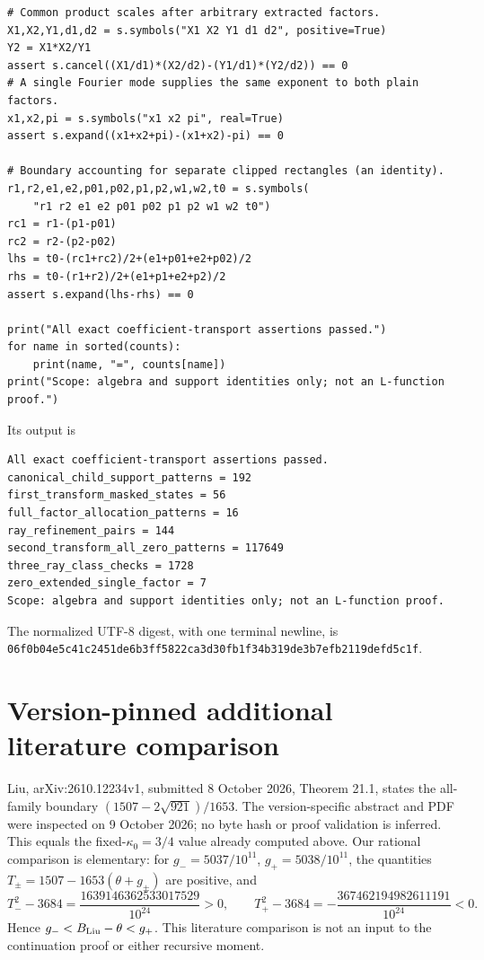 \documentclass[12pt]{article}
\begin{document}
\begin{verbatim}
# Common product scales after arbitrary extracted factors.
X1,X2,Y1,d1,d2 = s.symbols("X1 X2 Y1 d1 d2", positive=True)
Y2 = X1*X2/Y1
assert s.cancel((X1/d1)*(X2/d2)-(Y1/d1)*(Y2/d2)) == 0
# A single Fourier mode supplies the same exponent to both plain factors.
x1,x2,pi = s.symbols("x1 x2 pi", real=True)
assert s.expand((x1+x2+pi)-(x1+x2)-pi) == 0

# Boundary accounting for separate clipped rectangles (an identity).
r1,r2,e1,e2,p01,p02,p1,p2,w1,w2,t0 = s.symbols(
    "r1 r2 e1 e2 p01 p02 p1 p2 w1 w2 t0")
rc1 = r1-(p1-p01)
rc2 = r2-(p2-p02)
lhs = t0-(rc1+rc2)/2+(e1+p01+e2+p02)/2
rhs = t0-(r1+r2)/2+(e1+p1+e2+p2)/2
assert s.expand(lhs-rhs) == 0

print("All exact coefficient-transport assertions passed.")
for name in sorted(counts):
    print(name, "=", counts[name])
print("Scope: algebra and support identities only; not an L-function proof.")
\end{verbatim}
Its output is
\begin{verbatim}
All exact coefficient-transport assertions passed.
canonical_child_support_patterns = 192
first_transform_masked_states = 56
full_factor_allocation_patterns = 16
ray_refinement_pairs = 144
second_transform_all_zero_patterns = 117649
three_ray_class_checks = 1728
zero_extended_single_factor = 7
Scope: algebra and support identities only; not an L-function proof.
\end{verbatim}
The normalized UTF-8 digest, with one terminal newline, is
\nolinkurl{06f0b04e5c41c2451de6b3ff5822ca3d30fb1f34b319de3b7efb2119defd5c1f}.

\section{Version-pinned additional literature comparison}
Liu, arXiv:2610.12234v1, submitted 8 October 2026, Theorem 21.1,
states the all-family boundary
\((1507-2\sqrt{921})/1653\).
The version-specific abstract and PDF were inspected on
9 October 2026; no byte hash or proof validation is inferred.
This equals the fixed-\(\kappa_0=3/4\) value already computed above.
Our rational comparison is elementary: for
\(g_-=5037/10^{11}\), \(g_+=5038/10^{11}\), the quantities
\(T_\pm=1507-1653(\theta+g_\pm)\) are positive, and
\[
 T_-^2-3684=\frac{1639146362533017529}{10^{24}}>0,\qquad
 T_+^2-3684=-\frac{367462194982611191}{10^{24}}<0.
\]
Hence \(g_-<B_{\rm Liu}-\theta<g_+\).
This literature comparison is not an input to the continuation
proof or either recursive moment.
\end{document}
